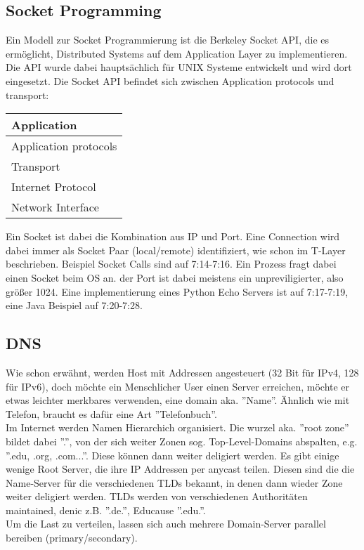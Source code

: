 	\subsection{Socket Programming}
		Ein Modell zur Socket Programmierung ist die Berkeley Socket API, die es ermöglicht, Distributed Systems auf dem Application Layer zu implementieren. Die API wurde dabei hauptsächlich für UNIX Systeme entwickelt und wird dort eingesetzt. Die Socket API befindet sich zwischen Application protocols und transport:
		\begin{table}[ht]
			\centering
			\begin{tabular}{|l|}
			\hline
			Application           \\ \hline
			Application protocols \\ \hline \hline
			Transport             \\ \hline
			Internet Protocol     \\ \hline
			Network Interface     \\ \hline
			\end{tabular}
		\end{table}
		Ein Socket ist dabei die Kombination aus IP und Port. Eine Connection wird dabei immer als Socket Paar (local/remote) identifiziert, wie schon im T-Layer beschrieben. Beispiel Socket Calls sind auf 7:14-7:16.
		Ein Prozess fragt dabei einen Socket beim OS an. der Port ist dabei meistens ein unpreviligierter, also größer 1024. Eine implementierung eines Python Echo Servers ist auf 7:17-7:19, eine Java Beispiel auf 7:20-7:28.
	\subsection{DNS}
		Wie schon erwähnt, werden Host mit Addressen angesteuert (32 Bit für IPv4, 128 für IPv6), doch möchte ein Menschlicher User einen Server erreichen, möchte er etwas leichter merkbares verwenden, eine domain aka. ''Name''. Ähnlich wie mit Telefon, braucht es dafür eine Art ''Telefonbuch''.\\
		Im Internet werden Namen Hierarchich organisiert. Die wurzel aka. ''root zone'' bildet dabei ''.'', von der sich weiter Zonen sog. Top-Level-Domains abspalten, e.g. ''.edu, .org, .com...''. Diese können dann weiter deligiert werden. Es gibt einige wenige Root Server, die ihre IP Addressen per anycast teilen. Diesen sind die die Name-Server für die verschiedenen TLDs bekannt, in denen dann wieder Zone weiter deligiert werden. TLDs werden von verschiedenen Authoritäten maintained, denic z.B. ''.de.'', Educause ''.edu.''. \\
		Um die Last zu verteilen, lassen sich auch mehrere Domain-Server parallel bereiben (primary/secondary). \\

